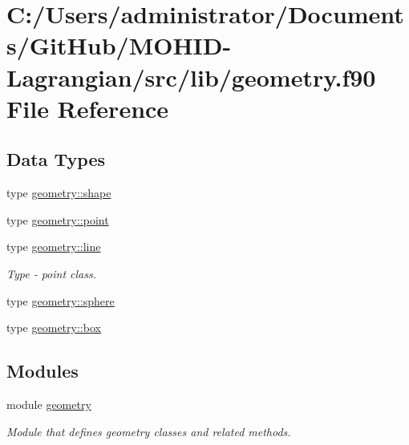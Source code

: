 \hypertarget{geometry_8f90}{}\section{C\+:/\+Users/administrator/\+Documents/\+Git\+Hub/\+M\+O\+H\+I\+D-\/\+Lagrangian/src/lib/geometry.f90 File Reference}
\label{geometry_8f90}
\subsection*{Data Types}
\begin{DoxyCompactItemize}
\item 
type \mbox{\hyperlink{structgeometry_1_1shape}{geometry\+::shape}}
\item 
type \mbox{\hyperlink{structgeometry_1_1point}{geometry\+::point}}
\item 
type \mbox{\hyperlink{structgeometry_1_1line}{geometry\+::line}}
\begin{DoxyCompactList}\small\item\em Type -\/ point class. \end{DoxyCompactList}\item 
type \mbox{\hyperlink{structgeometry_1_1sphere}{geometry\+::sphere}}
\item 
type \mbox{\hyperlink{structgeometry_1_1box}{geometry\+::box}}
\end{DoxyCompactItemize}
\subsection*{Modules}
\begin{DoxyCompactItemize}
\item 
module \mbox{\hyperlink{namespacegeometry}{geometry}}
\begin{DoxyCompactList}\small\item\em Module that defines geometry classes and related methods. \end{DoxyCompactList}\end{DoxyCompactItemize}
